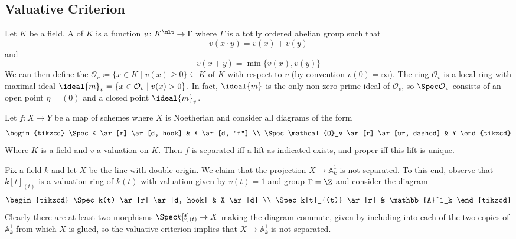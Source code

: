 \documentclass[wip, algebra]{bsteffan-lecturenotes}
\newcommand{\cO}{\mathcal{O}}
\newcommand{\A}{\mathbb{A}}
\begin{document}
\subsection{Valuative Criterion}
Let $K$ be a field.
A  of $K$ is a function $v\colon K^\mlt \to \Gamma$ where $\Gamma$ is a totlly ordered abelian group such that
\begin{equation*}
	v(x \cdot y) = v(x) + v(y)
\end{equation*}
and
\begin{equation*}
	v(x + y) = \min \{v(x), v(y)\}
\end{equation*}
We can then define the  $\cO_v \coloneq \{x \in K \mid v(x) \geq 0\} \subseteq K$ of $K$ with respect to $v$ (by convention $v(0) = \infty$).
The ring $\cO_v$ is a local ring with maximal ideal $\ideal{m}_v = \{x \in \cO_v \mid v(x) > 0\}$.
In fact, $\ideal{m}$ is the only non-zero prime ideal of $\cO_v$, so $\Spec \cO_v$ consists of an open point $\eta = (0)$ and a closed point $\ideal{m}_v$.
\begin{theorem}
	Let $f\colon X \to Y$ be a map of schemes where $X$ is Noetherian and consider all diagrams of the form
	\begin{equation*}
		\begin{tikzcd}
			\Spec K
					\ar[r]
					\ar[d, hook]
				& X
					\ar[d, "f"]
			\\
			\Spec \cO_v
					\ar[r]
					\ar[ur, dashed]
				& Y
		\end{tikzcd}
	\end{equation*}
	Where $K$ is a field and $v$ a valuation on $K$.
	Then $f$ is separated iff a lift as indicated exists, and proper iff this lift is unique.
\end{theorem}
\begin{example}
	Fix a field $k$ and let $X$ be the line with double origin.
	We claim that the projection $X \to \A^1_k$ is not separated.
	To this end, observe that $k[t]_{(t)}$ is a valuation ring of $k(t)$ with valuation given by $v(t) = 1$ and group $\Gamma = \Z$ and consider the diagram
	\begin{equation*}
		\begin{tikzcd}
			\Spec k(t)
					\ar[r]
					\ar[d, hook]
				& X
					\ar[d]
			\\
			\Spec k[t]_{(t)}
					\ar[r]
				& \A^1_k
		\end{tikzcd}
	\end{equation*}
	Clearly there are at least two morphisms $\Spec k[t]_{(t)} \to X$ making the diagram commute, given by including into each of the two copies of $\A^1_k$ from which $X$ is glued, so the valuative criterion implies that $X \to \A^1_k$ is not separated.
\end{example}
\end{document}

